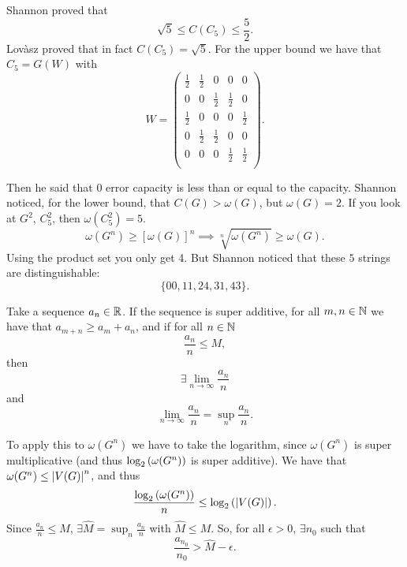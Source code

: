 Shannon proved that
\begin{equation*}
	\sqrt{5} \le C(C_5) \le \frac{5}{2}.
\end{equation*}
Lov\`asz proved that in fact $C(C_5) = \sqrt{5}$.
For the upper bound we have that $C_5 = G(W)$ with
\begin{equation*}
	W =
		\begin{pmatrix}
			\frac{1}{2} & \frac{1}{2} & 0 & 0 & 0 \\
			0 & 0 & \frac{1}{2} & \frac{1}{2} & 0 \\
			\frac{1}{2} & 0 & 0 & 0 & \frac{1}{2} \\
			0 & \frac{1}{2} & \frac{1}{2} & 0 & 0 \\
			0 & 0 & 0 & \frac{1}{2} & \frac{1}{2} \\
		\end{pmatrix}.
\end{equation*}

Then he said that 0 error capacity is less than or equal to the capacity.
Shannon noticed, for the lower bound, that $C(G) > \omega(G)$, but $\omega(G) = 2$.
If you look at $G^2$, \ie $C_5^2$, then $\omega(C_5^2) = 5$.
\begin{equation*}
	\omega(G^n) \ge [\omega(G)]^n \implies
	\sqrt[n]{\omega(G^n)} \ge \omega(G).
\end{equation*}
Using the product set you only get 4.
But Shannon noticed that these $5$ strings are distinguishable:
\begin{equation*}
	\{00, 11, 24, 31, 43\}.
\end{equation*}

\begin{lem}[Fekete]
	Take a sequence $a_n \in \mathbb{R}$.
	If the sequence is super additive, \ie for all $m, n \in \mathbb{N}$ we have that $a_{m+n} \ge a_m + a_n$, and if for all $n \in \mathbb{N}$
	\begin{equation*}
		\frac{a_n}{n} \le M,
	\end{equation*}
	then
	\begin{equation*}
		\exists \lim_{n \to \infty}  \frac{a_n}{n} 
	\end{equation*}
	and
	\begin{equation*}
		\lim_{n \to \infty}  \frac{a_n}{n} = \sup_n \frac{a_n}{n}.
	\end{equation*}
\end{lem}

To apply this to $\omega(G^n)$ we have to take the logarithm, since $\omega(G^n)$ is super multiplicative (and thus $\log_2 \left( {\omega(G^n)} \right)$ is super additive).
We have that $\omega(G^n) \le \left|{V(G)}\right|^n$, and thus
\begin{equation*}
	\frac{\log_2 \left( {\omega(G^n)} \right)}{n} \le \log_2 \left( {\left|{V(G)}\right|} \right).
\end{equation*}
Since $\frac{a_n}{n} \le M$, $\exists \hat{M} = \sup_n \frac{a_n}{n}$ with $\hat{M} \le M$.
So, for all $\epsilon > 0$, $\exists n_0$ such that
\begin{equation*}
	\frac{a_{n_0}}{n_0} > \hat{M} - \epsilon.
\end{equation*}

